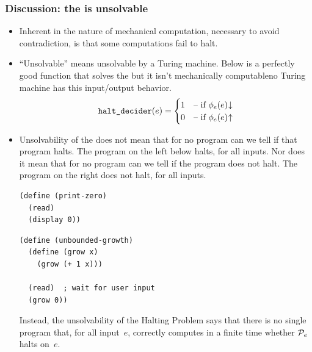 \documentclass[9pt,t,serif,professionalfont,xcolor={table,dvipsnames},noamsthm]{beamer}
\begin{document}
\begin{frame}[fragile]
  \frametitle{Discussion: the \HP{} is unsolvable}

\begin{itemize}
\item
Inherent in the nature of mechanical computation, necessary to avoid
contradiction, is that some computations fail to halt.

\pause
\item ``Unsolvable'' means unsolvable by a Turing machine.
  Below is a perfectly good function that solves the \HP{} 
  but it isn't mechanically computable\Dash no 
  Turing machine has this input/output behavior.
  \begin{equation*}
    \computablefunction{halt\_decider}(e)=
    \begin{cases}
      1  &\case{if $\TMfcn_e(e)\converges$}  \\
      0  &\case{if $\TMfcn_e(e)\diverges$}  \\
    \end{cases}
  \end{equation*}

\pause
\item
Unsolvability of the \HP{} 
does not mean that for no program can we tell if that program halts. 
The program on the left below halts, for all inputs.
Nor does it mean that for no program can we tell if the program does not halt.
The program on the right does not halt, for all inputs.
\begin{center}
\vspace*{-\ht\strutbox}
\begin{minipage}[t]{0.4\linewidth}%
\begin{lstlisting}
(define (print-zero)
  (read)
  (display 0))
\end{lstlisting}%
\end{minipage}%
\hspace*{2em plus 0.5fil}
\begin{minipage}[t]{0.4\linewidth}%
\begin{lstlisting}
(define (unbounded-growth)
  (define (grow x)
    (grow (+ 1 x)))
  
  (read)  ; wait for user input
  (grow 0))
\end{lstlisting}%
\end{minipage}%
\end{center}
Instead, the unsolvability of the Halting Problem 
says that there is no single program that, for all input~$e$, 
correctly computes in a finite time whether $\mathcal{P}_e$ halts on~$e$.
\end{itemize}
\end{frame}
\end{document}
